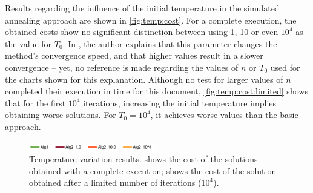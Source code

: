 Results regarding the influence of the initial temperature in the simulated annealing approach are shown in \cref{fig:temp:cost}. For a complete execution, the obtained costs show no significant distinction between using 1, 10 or even $10^{4}$ as the value for $T_{0}$. In \cite{Quinn2004}, the author explains that this parameter changes the method's convergence speed, and that higher values result in a slower convergence -- yet, no reference is made regarding the values of $n$ or $T_{0}$ used for the charts shown for this explanation. Although no test for larger values of $n$ completed their execution in time for this document, \cref{fig:temp:cost:limited} shows that for the first $10^{4}$ iterations, increasing the initial temperature implies obtaining worse solutions. For $T_{0}=10^{4}$, it achieves worse values than the basic approach.

\begin{figure}[!htp]
	\centering
	\includegraphics[width=0.5\textwidth]{report/images/temp-leg.png}

	\hfill
	\caption[Temperature Variations]{Temperature variation results.  shows the cost of the solutions obtained with a complete execution;
	 shows the cost of the solution obtained after a limited number of iterations ($10^{4}$).
	}
	\label{fig:temp}
\end{figure}
